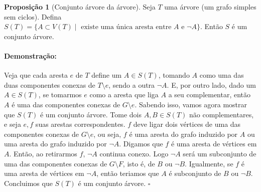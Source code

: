 \documentclass[11pt]{article}
\newcommand{\pulinho}{\vspace{.5cm}}
\theoremstyle{definition}
\theoremstyle{definition}
\theoremstyle{definition}
\newtheorem{prop}{Proposição}
\newenvironment{proposicao}{
\definecolor{shadecolor}{HTML}{FFDBDF}
\begin{shaded}
\begin{prop}
}
{
\end{prop}
\end{shaded}
}
\theoremstyle{definition}
\theoremstyle{definition}
\theoremstyle{definition}
\theoremstyle{definition}
\theoremstyle{definition}
\theoremstyle{definition}
\theoremstyle{definition}
\theoremstyle{definition}
\theoremstyle{definition}
\newenvironment{prova}{\paragraph{Demonstração:}}{\hfill$\square$ 
\pulinho
}
\theoremstyle{definition}
\begin{document}
\begin{proposicao}[Conjunto árvore da árvore]
  Seja $T$ uma árvore (um grafo simples sem ciclos). Defina $S(T) = \{A \subset V(T) \mid \text{ existe uma única aresta entre } A \text{ e } \lnot A\}$. Então $S$ é um conjunto árvore.
\end{proposicao}
\begin{prova}
Veja que cada aresta $e$ de $T$ define um $A \in S(T)$, tomando $A$ como uma das duas componentes conexas de $T \setminus e$, sendo a outra $\lnot A$. E, por outro lado, dado um $A \in S(T)$, se tomarmos $e$ como a aresta que liga $A$ a seu complementar, então $A$ é uma das componentes conexas de $G \setminus e$. Sabendo isso, vamos agora mostrar que $S(T)$ é um conjunto árvore. Tome dois $A,B \in S(T)$ não complementares, e seja $e,f$ suas arestas correspondentes. $f$ deve ligar dois vértices de uma das componentes conexas de $G\setminus e$, ou seja, $f$ é uma aresta do grafo induzido por $A$ ou uma aresta do grafo induzido por $\lnot A$. Digamos que $f$ é uma aresta de vértices em $A$. Então, ao retirarmos $f$, $\lnot A$ continua conexo. Logo $\lnot A$ será um subconjunto de uma das componentes conexas de $G \setminus F$, isto é, de $B$ ou $\lnot B$. Igualmente, se $f$ é uma aresta de vértices em $\lnot A$, então teriamos que $A$ é subconjunto de $B$ ou $\lnot B$. Concluimos que $S(T)$ é um conjunto árvore.
\end{prova}
\end{document}
